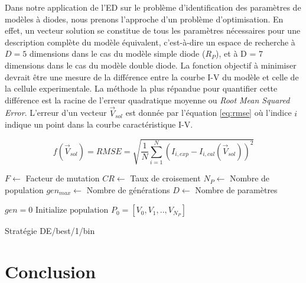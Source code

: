 Dans notre application de l'ED sur le problème d'identification des paramètres de modèles à diodes, nous prenons l'approche d'un problème d'optimisation. En effet, un vecteur solution se constitue de tous les paramètres nécessaires pour une description complète du modèle équivalent, c'est-à-dire un espace de recherche à $D = 5$ dimensions dans le cas du modèle simple diode ($R_P$), et à D = 7 dimensions dans le cas du modèle double diode. La fonction objectif à minimiser devrait être une mesure de la différence entre la courbe I-V du modèle et celle de la cellule experimentale. La méthode la plus répandue pour quantifier cette différence est la racine de l'erreur quadratique moyenne ou \textit{Root Mean Squared Error}. L'erreur d'un vecteur $\vec{V}_{sol}$ est donnée par l'équation \ref{eq:rmse} où l'indice $i$ indique un point dans la courbe caractéristique I-V.

\begin{equation}
  \label{eq:rmse}
  f(\vec{V}_{sol}) = RMSE = \sqrt{\frac{1}{N} \sum_{i = 1}^{N} (I_{i,exp} - I_{i, cal}(\vec{V}_{sol}))^2 }
\end{equation}

\begin{algorithm}
  $F \gets$ Facteur de mutation\;
  $CR \gets$ Taux de croisement\;
  $N_P \gets$ Nombre de population\;
  $gen_{max} \gets$ Nombre de générations\;
  $D \gets $ Nombre de paramètres\;
  
  $gen = 0$\;
  $\text{Initialize population\ } P_0 = [V_0, V_1, .., V_{N_P}]$\;
  \caption{Stratégie DE/best/1/bin}
  \label{alg:debestbin}
\end{algorithm}



\section{Conclusion}

